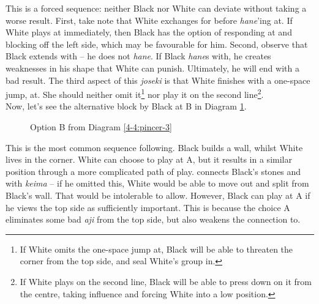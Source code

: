 \documentclass[a5paper,12pt,twoside]{book} %
\newcounter{joseki}                 %
\newcommand{\dref}[1]{Diagram \ref{#1}}
\newcommand{\addstufftotoc}[2][toc]{%
  \addtocontents{#1}{#2}}
\begin{document}
This is a forced sequence: neither Black nor White can deviate without taking a worse result. First, take note that White exchanges{\large\whitestone[5]} for{\large\blackstone[6]} before \textit{hane}'ing at{\large\whitestone[7]}. If White plays at{\large\whitestone[7]} immediately, then Black has the option of responding at{\large\whitestone[5]} and blocking off the left side, which may be favourable for him. Second, observe that Black extends with{\large\blackstone[6]} – he does not \textit{hane}. If Black \textit{hane}s with{\large\blackstone[6]}, he creates weaknesses in his shape that White can punish. Ultimately, he will end with a bad result. The third aspect of this \textit{joseki} is that White finishes with a one-space jump, at{\large\whitestone[11]}. She should neither omit it\footnote{If White omits the one-space jump at{\large\whitestone[11]}, Black will be able to threaten the corner from the top side, and seal White's group in.} nor play it on the second line\footnote{If White plays on the second line, Black will be able to press down on it from the centre, taking influence and forcing White into a low position.}.\\

Now, let's see the alternative block by Black at B in \dref{4-4:pincer-5}.\\

\begin{figure}[!htbp]
 
\vspace{-0.6cm}\caption{Option B from \dref{4-4:pincer-3}}
\label{4-4:pincer-5}
\end{figure}

\addstufftotoc{\nobreak\smallskip\protect\par}

This is the most common sequence following{\large\blackstone[4]}. Black builds a wall, whilst White lives in the corner. White can choose to play{\large\whitestone[7]} at A, but it results in a similar position through a more complicated path of play.{\large\blackstone[8]} connects Black's stones{\large\blackstone[6]} and{\large\blackstone[2]} with \textit{keima} – if he omitted this, White would be able to move out and split{\large\blackstone[2]} from Black's wall. That would be intolerable to allow. However, Black can play{\large\blackstone[8]} at A if he views the top side as sufficiently important. This is because the choice A eliminates some bad \textit{aji} from the top side, but also weakens the connection to{\large\blackstone[2]}. \\
\end{document}
